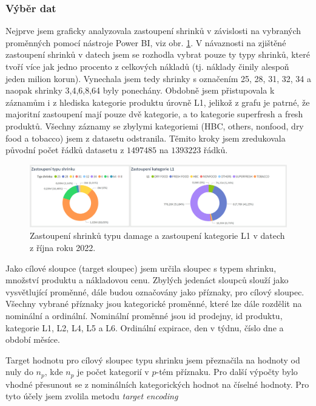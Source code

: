 \subsubsection{Výběr dat}

Nejprve jsem graficky analyzovala zastoupení shrinků v závislosti na vybraných proměnných pomocí nástroje Power BI, viz obr. \ref*{obr:rok:g:zastoupeni1}. V návaznosti na zjištěné zastoupení shrinků v datech jsem se rozhodla vybrat pouze ty typy shrinků, které tvoří více jak jedno procento z celkových nákladů (tj. náklady činily alespoň jeden milion korun). Vynechala jsem tedy shrinky s označením 25, 28, 31, 32, 34 a naopak shrinky 3,4,6,8,64 byly ponechány. Obdobně jsem přistupovala k záznamům i z hlediska kategorie produktu úrovně L1, jelikož z grafu je patrné, že majoritní zastoupení mají pouze dvě kategorie, a to kategorie superfresh a fresh produktů. Všechny záznamy se zbylymi kategoriemi (HBC, others, nonfood, dry food a tobacco) jsem z datasetu odstranila. Těmito kroky jsem zredukovala původní počet řádků datasetu z $1 497 485$ na $1 393 223$ řádků.

\begin{figure}[hbtp!]
    \centering
    \includegraphics[width=\textwidth]{obrazky/grafy/zastoupeni1.png}
    \caption{Zastoupení shrinků typu damage a zastoupení kategorie L1 v datech z října roku 2022.}
    \label{obr:rok:g:zastoupeni1}
\end{figure}

Jako cílové sloupce (target sloupec) jsem určila sloupec s typem shrinku, množství produktu a nákladovou cenu. Zbylých jedenáct sloupců slouží jako vysvětlující proměnné, dále budou označovány jako příznaky, pro cílový sloupec. Všechny vybrané příznaky jsou kategorické proměnné, které lze dále rozdělit na nominální a ordinální. Nominální proměnné jsou id prodejny, id produktu, kategorie L1, L2, L4, L5 a L6. Ordinální expirace, den v týdnu, číslo dne a období měsíce.

Target hodnotu pro cílový sloupec typu shrinku jsem přeznačila na hodnoty od nuly do $n_p$, kde $n_p$ je počet kategorií v $p$-tém příznaku. Pro další výpočty bylo vhodné přesunout se z nominálních kategorických hodnot na číselné hodnoty. Pro tyto účely jsem zvolila metodu \emph{target encoding} %

